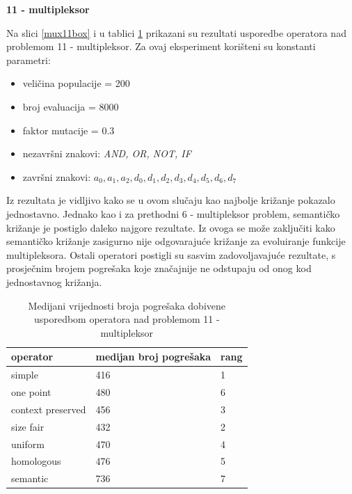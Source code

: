 \textbf{11 - multipleksor}

Na slici \ref{mux11box} i u tablici \ref{mux11table} prikazani su rezultati usporedbe operatora nad problemom 11 - multipleksor. Za ovaj eksperiment korišteni su konstanti parametri:
\begin{itemize}
\item{veličina populacije = 200}
\item{broj evaluacija = 8000}
\item{faktor mutacije = 0.3}
\item{nezavršni znakovi: \textit{AND, OR, NOT, IF}}
\item{završni znakovi: \textit{$a_0, a_1, a_2, d_0, d_1, d_2, d_3, d_4, d_5, d_6, d_7$}}
\end{itemize}

Iz rezultata je vidljivo kako se u ovom slučaju kao najbolje križanje pokazalo jednostavno. Jednako kao i za prethodni 6 - multipleksor problem, semantičko križanje je postiglo daleko najgore rezultate. Iz ovoga se može zaključiti kako semantičko križanje zasigurno nije odgovarajuće križanje za evoluiranje funkcije multipleksora. Ostali operatori postigli su sasvim zadovoljavajuće rezultate, s prosječnim brojem pogrešaka koje značajnije ne odstupaju od onog kod jednostavnog križanja.

\begin{table}[H]
 	\centering
  \caption{Medijani vrijednosti broja pogrešaka dobivene usporedbom operatora nad problemom 11 - multipleksor}
    \begin{tabular}{| l | l | l |}
    \hline
    \textbf{operator} & \textbf{medijan broj pogrešaka} & \textbf{rang}\\ \hline
    simple & 416 &1\\ \hline
    one point & 480 & 6\\ \hline
    context preserved & 456 & 3\\ \hline
    size fair & 432 & 2\\ \hline
    uniform & 470 & 4\\ \hline
    homologous & 476 & 5\\ \hline
    semantic & 736 & 7\\ \hline
    \end{tabular}
    
  
    \label{mux11table}
\end{table}

